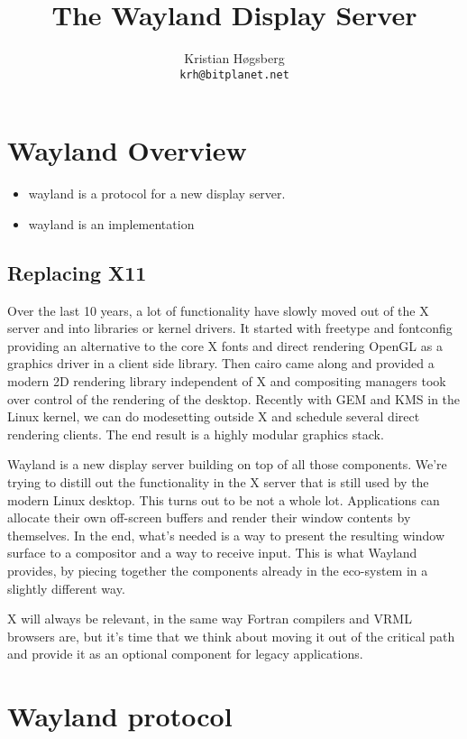 \documentclass{article}
\author{Kristian Høgsberg\\
\texttt{krh@bitplanet.net}
}
\title{The Wayland Display Server}
\begin{document}
\maketitle

\section{Wayland Overview}

\begin{itemize}
\item wayland is a protocol for a new display server.  
\item wayland is an implementation
\end{itemize}

\subsection{Replacing X11}

Over the last 10 years, a lot of functionality have slowly moved out
of the X server and into libraries or kernel drivers. It started with
freetype and fontconfig providing an alternative to the core X fonts
and direct rendering OpenGL as a graphics driver in a client side
library. Then cairo came along and provided a modern 2D rendering
library independent of X and compositing managers took over control of
the rendering of the desktop. Recently with GEM and KMS in the Linux
kernel, we can do modesetting outside X and schedule several direct
rendering clients. The end result is a highly modular graphics stack.

Wayland is a new display server building on top of all those
components. We’re trying to distill out the functionality in the X
server that is still used by the modern Linux desktop. This turns out
to be not a whole lot. Applications can allocate their own off-screen
buffers and render their window contents by themselves. In the end,
what’s needed is a way to present the resulting window surface to a
compositor and a way to receive input. This is what Wayland provides,
by piecing together the components already in the eco-system in a
slightly different way.

X will always be relevant, in the same way Fortran compilers and VRML
browsers are, but it’s time that we think about moving it out of the
critical path and provide it as an optional component for legacy
applications.


\section{Wayland protocol}
\end{document}
